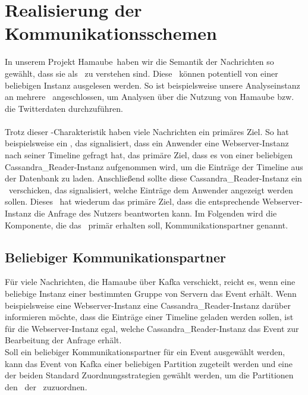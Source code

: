 \section{Realisierung der Kommunikationsschemen}
In unserem Projekt \glqq Hamaube\grqq\ haben wir die Semantik der Nachrichten so gewählt, dass sie als \Evs\ zu verstehen sind. Diese \Evs\ können potentiell von einer beliebigen Instanz ausgelesen werden. So ist beispielsweise unsere Analyseinstanz an mehrere \Tcs\ angeschlossen, um Analysen über die Nutzung von Hamaube bzw. die Twitterdaten durchzuführen. \\
\\
Trotz dieser \Ev-Charakteristik haben viele Nachrichten ein primäres Ziel. So hat beispielsweise ein \Ev, das signalisiert, dass ein Anwender eine Webserver-Instanz nach seiner Timeline gefragt hat, das primäre Ziel, dass es von einer beliebigen Cassandra\_Reader-Instanz aufgenommen wird, um die Einträge der Timeline aus der Datenbank zu laden. Anschließend sollte diese Cassandra\_Reader-Instanz ein \Ev\ verschicken, das signalisiert, welche Einträge dem Anwender angezeigt werden sollen. Dieses \Ev\ hat wiederum das primäre Ziel, dass die entsprechende Webserver-Instanz die Anfrage des Nutzers beantworten kann. Im Folgenden wird die Komponente, die das \Ev\ primär erhalten soll, Kommunikationspartner genannt.
\subsection{Beliebiger Kommunikationspartner}
Für viele Nachrichten, die Hamaube über Kafka verschickt, reicht es, wenn eine beliebige Instanz einer bestimmten Gruppe von Servern das Event erhält. Wenn beispielsweise eine Webserver-Instanz eine Cassandra\_Reader-Instanz darüber informieren möchte, dass die Einträge einer Timeline geladen werden sollen, ist für die Webserver-Instanz egal, welche Cassandra\_Reader-Instanz das Event zur Bearbeitung der Anfrage erhält.\\
Soll ein beliebiger Kommunikationspartner für ein Event ausgewählt werden, kann das Event von Kafka einer beliebigen Partition zugeteilt werden und eine der beiden Standard Zuordnungsstrategien gewählt werden, um die Partitionen den \Cn\ der \CG\ zuzuordnen.
